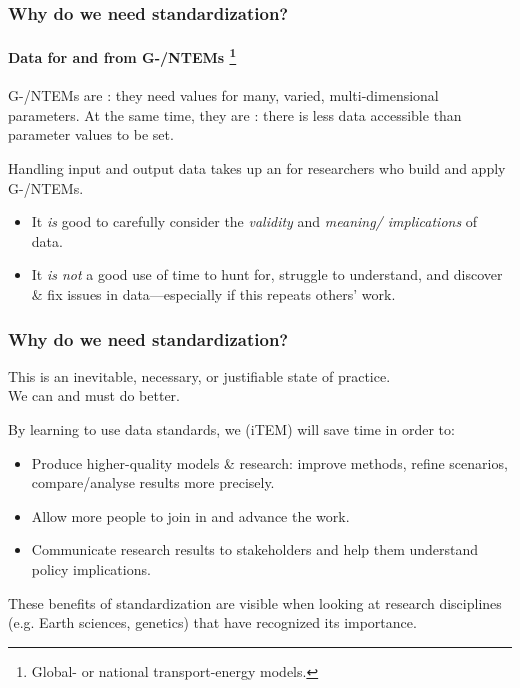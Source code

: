 \documentclass[12pt,aspectratio=169]{beamer}
\begin{document}
\begin{frame}
\frametitle{Why do we need standardization?}
\framesubtitle{Data for and from G-/NTEMs%
\footnote{Global- or national transport-energy models.}}

G-/NTEMs are : they need values for many, varied, multi-dimensional parameters.
At the same time, they are  : there is less data accessible than parameter values to be set.

\bigskip
Handling input and output data takes up an  for researchers who build and apply G-/NTEMs.
\begin{itemize}
  \item It \emph{is} good to carefully consider the \emph{validity} and \emph{meaning/ implications} of data.
  \item It \emph{is not} a good use of time to hunt for, struggle to understand, and discover \& fix issues in data—especially if this repeats others' work.
\end{itemize}

\end{frame}

\begin{frame}
\frametitle{Why do we need standardization?}

This is  an inevitable, necessary, or justifiable state of practice.\\
We can and must do better.

\medskip
By learning to use data standards, we (iTEM) will save time in order to:
\begin{itemize}
  \item Produce higher-quality models \& research: improve methods, refine scenarios, compare/analyse results more precisely.
  \item Allow more people to join in and advance the work.
  \item Communicate research results to stakeholders and help them understand policy implications.
\end{itemize}

\medskip
These benefits of standardization are visible when looking at research disciplines (e.g. Earth sciences, genetics) that have recognized its importance.
\end{frame}
\end{document}
